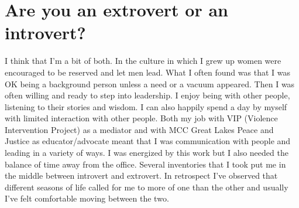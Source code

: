 \section{Are you an extrovert or an introvert?}
I think that I'm a bit of both.
In the culture in which I grew up women were encouraged to be reserved and let men lead.
What I often found was that I was OK being a background person unless a need or a vacuum appeared.
Then I was often willing and ready to step into leadership.
I enjoy being with other people, listening to their stories and wisdom.
I can also happily spend a day by myself with limited interaction with other people.
Both my job with VIP (Violence Intervention Project) as a mediator and with MCC Great Lakes Peace and Justice as educator/advocate meant that I was communication with people and leading in a variety of ways.
I was energized by this work but I also needed the balance of time away from the office.
Several inventories that I took put me in the middle between introvert and extrovert.
In retrospect I've observed that different seasons of life called for me to more of one than the other and usually I've felt comfortable moving between the two.





